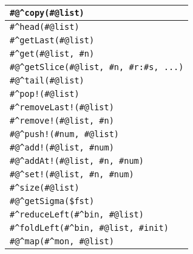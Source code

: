\begin{tabular}{|l|}
\hline
\verb!#@^copy(#@list)! \\
\hline
\verb!#^head(#@list)! \\
\verb!#^getLast(#@list)! \\
\verb!#^get(#@list, #n)! \\
\verb!#@^getSlice(#@list, #n, #r:#s, ...)! \\
\verb!#@^tail(#@list)! \\
\hline
\verb+#^pop!(#@list)+ \\
\verb+#^removeLast!(#@list)+ \\
\verb+#^remove!(#@list, #n)+ \\
\hline
\verb+#@^push!(#num, #@list)+ \\
\verb+#@^add!(#@list, #num)+ \\
\verb+#@^addAt!(#@list, #n, #num)+ \\
\hline
\verb+#@^set!(#@list, #n, #num)+ \\
\hline
\verb!#^size(#@list)! \\
\verb!#@^getSigma($fst)! \\
\hline
\verb!#^reduceLeft(#^bin, #@list)! \\
\verb!#^foldLeft(#^bin, #@list, #init)! \\
\hline
\verb!#@^map(#^mon, #@list)! \\
\hline

\end{tabular}

